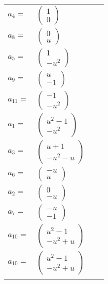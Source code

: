 \documentclass[1p]{elsarticle_modified}
\theoremstyle{definition}
\begin{document}
\begin{tabular}{m{7pt} m{180pt} m{7pt} m{180pt} }
\flushright $a_{4}=$&$\begin{pmatrix}1\\0\end{pmatrix}$ \\
\flushright $a_{8}=$&$\begin{pmatrix}0\\u\end{pmatrix}$ \\
\flushright $a_{5}=$&$\begin{pmatrix}1\\- u^2\end{pmatrix}$ \\
\flushright $a_{9}=$&$\begin{pmatrix}u\\-1\end{pmatrix}$ \\
\flushright $a_{11}=$&$\begin{pmatrix}-1\\- u^2\end{pmatrix}$ \\
\flushright $a_{1}=$&$\begin{pmatrix}u^2-1\\- u^2\end{pmatrix}$ \\
\flushright $a_{3}=$&$\begin{pmatrix}u+1\\- u^2- u\end{pmatrix}$ \\
\flushright $a_{6}=$&$\begin{pmatrix}- u\\u\end{pmatrix}$ \\
\flushright $a_{2}=$&$\begin{pmatrix}0\\- u\end{pmatrix}$ \\
\flushright $a_{7}=$&$\begin{pmatrix}- u\\-1\end{pmatrix}$ \\
\flushright $a_{10}=$&$\begin{pmatrix}u^2-1\\- u^2+u\end{pmatrix}$\\ \flushright $a_{10}=$&$\begin{pmatrix}u^2-1\\- u^2+u\end{pmatrix}$\\&\end{tabular}
\end{document}
